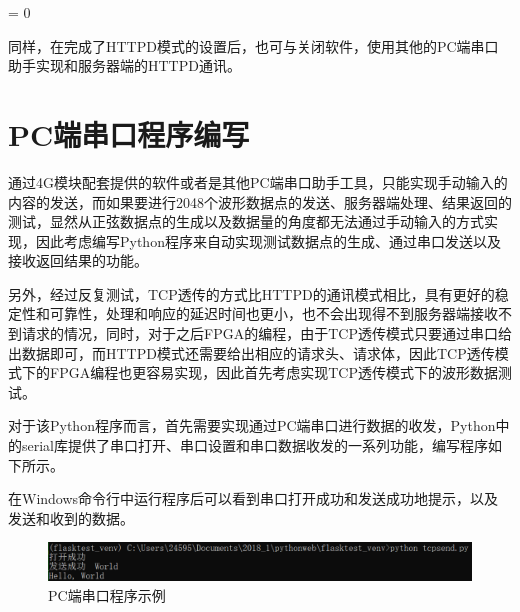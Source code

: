 \documentclass[a4paper,11pt]{ctexart}
\newcommand{\subpar}
{
	\par
	\hangafter = 0
	\setlength{\hangindent}{1em}
}
\begin{document}
\begin{spacing}{1.5}
\subpar
同样，在完成了HTTPD模式的设置后，也可与关闭软件，使用其他的PC端串口助手实现和服务器端的HTTPD通讯。

\section{PC端串口程序编写}
\par
通过4G模块配套提供的软件或者是其他PC端串口助手工具，只能实现手动输入的内容的发送，而如果要进行2048个波形数据点的发送、服务器端处理、结果返回的测试，显然从正弦数据点的生成以及数据量的角度都无法通过手动输入的方式实现，因此考虑编写Python程序来自动实现测试数据点的生成、通过串口发送以及接收返回结果的功能。
\par
另外，经过反复测试，TCP透传的方式比HTTPD的通讯模式相比，具有更好的稳定性和可靠性，处理和响应的延迟时间也更小，也不会出现得不到服务器端接收不到请求的情况，同时，对于之后FPGA的编程，由于TCP透传模式只要通过串口给出数据即可，而HTTPD模式还需要给出相应的请求头、请求体，因此TCP透传模式下的FPGA编程也更容易实现，因此首先考虑实现TCP透传模式下的波形数据测试。
\par
对于该Python程序而言，首先需要实现通过PC端串口进行数据的收发，Python中的serial库提供了串口打开、串口设置和串口数据收发的一系列功能，编写程序如下所示。
\par
在Windows命令行中运行程序后可以看到串口打开成功和发送成功地提示，以及发送和收到的数据。
\begin{figure}[h]
	\centering
	\setlength{\abovecaptionskip}{2mm}
	\setlength{\belowcaptionskip}{-2mm}
	\includegraphics[scale=0.3]{PC.png}
	\caption{PC端串口程序示例}\label{figure:PC}
\end{figure}


\end{spacing}
\end{document}
